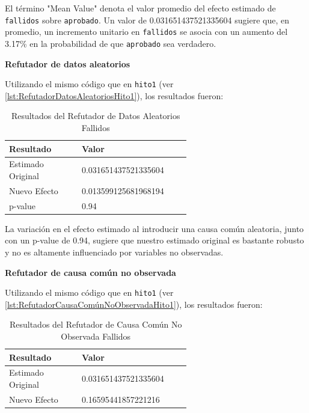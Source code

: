 El término "Mean Value" denota el valor promedio del efecto estimado de \texttt{fallidos} sobre \texttt{aprobado}. Un valor de 0.031651437521335604 sugiere que, en promedio, un incremento unitario en \texttt{fallidos} se asocia con un aumento del 3.17\% en la probabilidad de que \texttt{aprobado} sea verdadero.

\textbf{Refutador de datos aleatorios}

Utilizando el mismo código que en \texttt{hito1} (ver \ref{lst:RefutadorDatosAleatoriosHito1}), los resultados fueron:

\begin{table}[H]
    \centering        
    \begin{tabular}{lp{0.6\linewidth}}
        \toprule
        \textbf{Resultado} & \textbf{Valor} \\
        \midrule
        Estimado Original & 0.031651437521335604 \\
        Nuevo Efecto & 0.013599125681968194 \\
        p-value & 0.94 \\
        \bottomrule
    \end{tabular}
    \caption{Resultados del Refutador de Datos Aleatorios Fallidos}
    \label{tab:refutador_datos_aleatorios_Fallidos}
\end{table}

La variación en el efecto estimado al introducir una causa común aleatoria, junto con un p-value de 0.94, sugiere que nuestro estimado original es bastante robusto y no es altamente influenciado por variables no observadas.

\textbf{Refutador de causa común no observada}

Utilizando el mismo código que en \texttt{hito1} (ver \ref{lst:RefutadorCausaComúnNoObservadaHito1}), los resultados fueron:

\begin{table}[H]
    \centering
    \begin{tabular}{lp{0.6\linewidth}}
        \toprule
        \textbf{Resultado} & \textbf{Valor} \\
        \midrule
        Estimado Original & 0.031651437521335604 \\
        Nuevo Efecto & 0.16595441857221216 \\
        \bottomrule
    \end{tabular}
    \caption{Resultados del Refutador de Causa Común No Observada Fallidos}
    \label{tab:refutador_causa_no_observada_fallidos}
\end{table}

